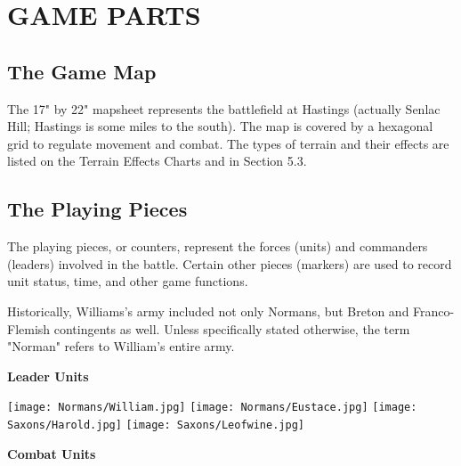 \section{GAME PARTS}

\subsection{The Game Map}

The 17" by 22" mapsheet represents the battlefield at Hastings (actually Senlac Hill; Hastings is some miles to the south). The map is covered by a hexagonal grid to regulate movement and combat. The types of terrain and their effects are listed on the Terrain Effects Charts and in Section 5.3.

\subsection{The Playing Pieces}

The playing pieces, or counters, represent the forces (units) and commanders (leaders) involved in the battle. Certain other pieces (markers) are used to record unit status, time, and other game functions.

Historically, Williams's army included not only Normans, but Breton and Franco-Flemish contingents as well. Unless specifically stated otherwise, the term "Norman" refers to William's entire army.

\begin{center}
\textbf{Leader Units}
\end{center}
\par
\hspace{1em}
\texttt{[image: Normans/William.jpg]}
\hspace{1em}
\texttt{[image: Normans/Eustace.jpg]}
\hspace{1em}
\texttt{[image: Saxons/Harold.jpg]}
\hspace{1em}
\texttt{[image: Saxons/Leofwine.jpg]}

\par
\begin{center}
  \textbf{Combat Units}
  \break
\end{center}

